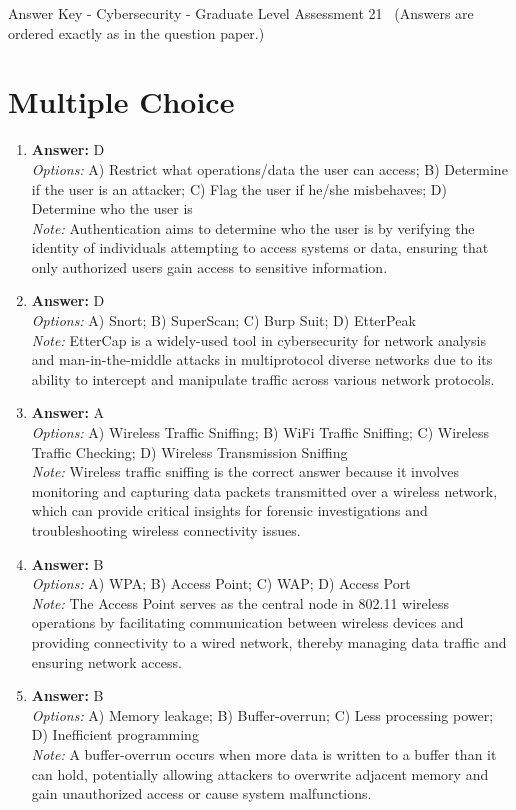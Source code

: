 \documentclass[12pt]{article}
\begin{document}
\begin{center}
Answer Key - Cybersecurity - Graduate Level Assessment 21 \
\small (Answers are ordered exactly as in the question paper.)
\end{center}

\section*{Multiple Choice}
\begin{enumerate}[label=\arabic*.]
\item \textbf{Answer:} D
\\ \textit{Options:} A) Restrict what operations/data the user can access; B) Determine if the user is an attacker; C) Flag the user if he/she misbehaves; D) Determine who the user is
\\ \textit{Note:} Authentication aims to determine who the user is by verifying the identity of individuals attempting to access systems or data, ensuring that only authorized users gain access to sensitive information.
\item \textbf{Answer:} D
\\ \textit{Options:} A) Snort; B) SuperScan; C) Burp Suit; D) EtterPeak
\\ \textit{Note:} EtterCap is a widely-used tool in cybersecurity for network analysis and man-in-the-middle attacks in multiprotocol diverse networks due to its ability to intercept and manipulate traffic across various network protocols.
\item \textbf{Answer:} A
\\ \textit{Options:} A) Wireless Traffic Sniffing; B) WiFi Traffic Sniffing; C) Wireless Traffic Checking; D) Wireless Transmission Sniffing
\\ \textit{Note:} Wireless traffic sniffing is the correct answer because it involves monitoring and capturing data packets transmitted over a wireless network, which can provide critical insights for forensic investigations and troubleshooting wireless connectivity issues.
\item \textbf{Answer:} B
\\ \textit{Options:} A) WPA; B) Access Point; C) WAP; D) Access Port
\\ \textit{Note:} The Access Point serves as the central node in 802.11 wireless operations by facilitating communication between wireless devices and providing connectivity to a wired network, thereby managing data traffic and ensuring network access.
\item \textbf{Answer:} B
\\ \textit{Options:} A) Memory leakage; B) Buffer-overrun; C) Less processing power; D) Inefficient programming
\\ \textit{Note:} A buffer-overrun occurs when more data is written to a buffer than it can hold, potentially allowing attackers to overwrite adjacent memory and gain unauthorized access or cause system malfunctions.
\end{enumerate}
\end{document}
